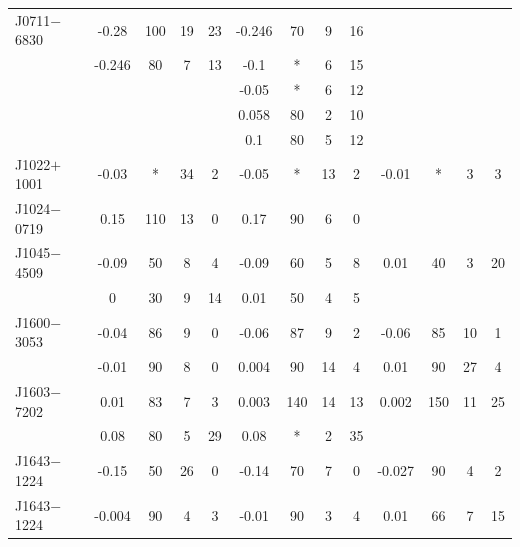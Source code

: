 \documentclass[useAMS,usenatbib]{mn2e}
\begin{document}
\begin{table}
\begin{tabular}{lcccccccccccc}
J0711$-$6830    & -0.28  & 100        & 19    & 23   & -0.246 &  70        & 9       & 16      &        &            &        &       \\
                & -0.246 & 80         & 7     & 13   & -0.1   & *          & 6       & 15      &        &            &        &       \\
                &        &            &       &      & -0.05  & *          & 6       & 12      &        &            &        &       \\
                &        &            &       &      & 0.058  & 80         & 2       & 10      &        &            &        &       \\
                &        &            &       &      & 0.1    & 80         & 5       & 12      &        &            &        &       \\
J1022$+$1001    & -0.03  & *          & 34    & 2    & -0.05  & *          & 13      & 2       & -0.01  & *          &  3     &  3    \\
J1024$-$0719    & 0.15   & 110        & 13    & 0    & 0.17   &  90        & 6       & 0       &        &            &        &       \\
J1045$-$4509    & -0.09  & 50         & 8     & 4    & -0.09  &  60        & 5       & 8       & 0.01   &  40        &  3     &  20   \\
                &  0     & 30         & 9     & 14   & 0.01   &  50        & 4       & 5       &        &            &        &       \\
J1600$-$3053    & -0.04  & 86         & 9     & 0    & -0.06  &  87        & 9       & 2       & -0.06  &  85        &  10    &  1    \\
                & -0.01  & 90         & 8     & 0    & 0.004  &  90        & 14      & 4       & 0.01   &  90        &  27    &  4    \\
J1603$-$7202    &  0.01  & 83         & 7     & 3    & 0.003  &  140       & 14      & 13      & 0.002  &  150       &  11    &  25   \\
                &  0.08  & 80         & 5     & 29   & 0.08   &  *         & 2       & 35      &        &            &        &       \\
J1643$-$1224    &  -0.15 & 50         & 26    & 0    & -0.14  &  70        & 7       & 0       & -0.027 &  90        &  4     &  2    \\
J1643$-$1224    & -0.004 & 90         & 4     & 3    & -0.01  &  90        & 3       & 4       & 0.01   &  66        &  7     &  15   \\

\end{tabular}
\end{table}
\end{document}
